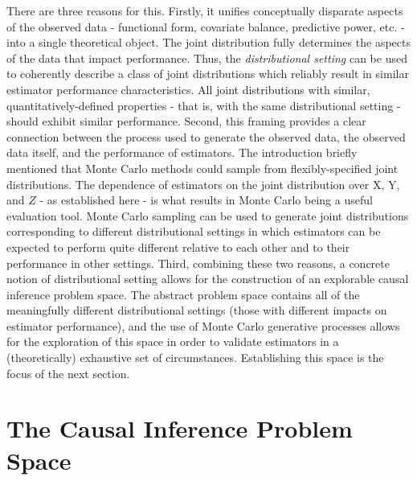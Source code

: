 \documentclass[../main.tex]{subfiles}
\begin{document}
\vspace{\baselineskip}
There are three reasons for this. Firstly, it unifies conceptually disparate aspects of the observed data - functional form, covariate balance, predictive power, etc. - into a single theoretical object. The joint distribution fully determines the aspects of the data that impact performance. Thus, the \textit{distributional setting }can be used to coherently describe a class of joint distributions which reliably result in similar estimator performance characteristics. All joint distributions with similar, quantitatively-defined properties - that is, with the same distributional setting - should exhibit similar performance. Second, this framing provides a clear connection between the process used to generate the observed data, the observed data itself, and the performance of estimators. The introduction briefly mentioned that Monte Carlo methods could sample from flexibly-specified joint distributions. The dependence of estimators on the joint distribution over  \( \text{X, Y} \), and  \( Z \)  - as established here - is what results in Monte Carlo being a useful evaluation tool. Monte Carlo sampling can be used to generate joint distributions corresponding to different distributional settings in which estimators can be expected to perform quite different relative to each other and to their performance in other settings. Third, combining these two reasons, a concrete notion of distributional setting allows for the construction of an explorable causal inference problem space. The abstract problem space contains all of the meaningfully different distributional settings (those with different impacts on estimator performance), and the use of Monte Carlo generative processes allows for the exploration of this space in order to validate estimators in a (theoretically) exhaustive set of circumstances. Establishing this space is the focus of the next section.\par

\section{The Causal Inference Problem Space}

\vspace{\baselineskip}
\end{document}
